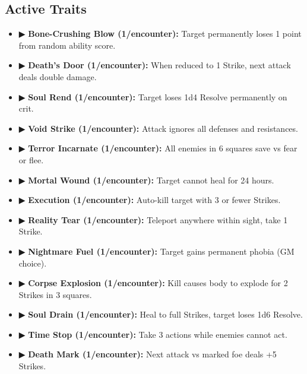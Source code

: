 \documentclass[10pt,twoside]{article}
\begin{document}
\subsection{Active Traits}
\begin{multicols}{2}
{\footnotesize
\begin{itemize}

\item ▶ \textbf{Bone-Crushing Blow (1/encounter):} Target permanently loses 1 point from random ability score.

\item ▶ \textbf{Death's Door (1/encounter):} When reduced to 1 Strike, next attack deals double damage.

\item ▶ \textbf{Soul Rend (1/encounter):} Target loses 1d4 Resolve permanently on crit.

\item ▶ \textbf{Void Strike (1/encounter):} Attack ignores all defenses and resistances.

\item ▶ \textbf{Terror Incarnate (1/encounter):} All enemies in 6 squares save vs fear or flee.

\item ▶ \textbf{Mortal Wound (1/encounter):} Target cannot heal for 24 hours.

\item ▶ \textbf{Execution (1/encounter):} Auto-kill target with 3 or fewer Strikes.

\item ▶ \textbf{Reality Tear (1/encounter):} Teleport anywhere within sight, take 1 Strike.

\item ▶ \textbf{Nightmare Fuel (1/encounter):} Target gains permanent phobia (GM choice).

\item ▶ \textbf{Corpse Explosion (1/encounter):} Kill causes body to explode for 2 Strikes in 3 squares.

\item ▶ \textbf{Soul Drain (1/encounter):} Heal to full Strikes, target loses 1d6 Resolve.

\item ▶ \textbf{Time Stop (1/encounter):} Take 3 actions while enemies cannot act.

\item ▶ \textbf{Death Mark (1/encounter):} Next attack vs marked foe deals +5 Strikes.


\end{itemize}}
\end{multicols}
\end{document}
